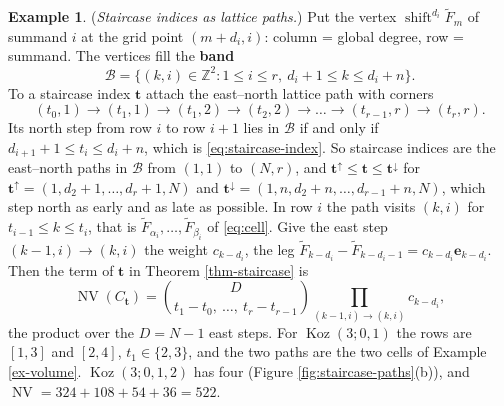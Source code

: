 \documentclass[11pt, a4paper, abstract=yes]{scrartcl}
\theoremstyle{definition}
\newtheorem{mexample}[definition]{Example}
\theoremstyle{remark}
\theoremstyle{plain}
\newcommand{\vek}[1]{\boldsymbol{#1}}
\theoremstyle{remark}
\theoremstyle{plain}
\newcommand{\Koz}{\operatorname{Koz}}
\newcommand{\shift}{\operatorname{shift}}
\newcommand{\NV}{\operatorname{NV}}
\begin{document}
\begin{mexample}
(\emph{Staircase indices as lattice paths.}) Put the vertex \(\shift^{d_i}\tilde F_m\) of summand \(i\)
at the grid point \((m+d_i,i)\): column = global degree, row = summand. The vertices fill the \textbf{band}
\begin{equation}\label{eq:band}
  \mathcal B=\lbrace(k,i)\in\mathbb Z^2:1\le i\le r,\ d_i+1\le k\le d_i+n\rbrace .
\end{equation}
To a staircase index \(\vek t\) attach the east--north lattice path with corners
\[
  (t_0,1)\to(t_1,1)\to(t_1,2)\to(t_2,2)\to\dots\to(t_{r-1},r)\to(t_r,r).
\]
Its north step from row \(i\) to row \(i+1\) lies in \(\mathcal B\) if and only if
\(d_{i+1}+1\le t_i\le d_i+n\), which is \eqref{eq:staircase-index}. So staircase indices are the
east--north paths in \(\mathcal B\) from \((1,1)\) to \((N,r)\), and
\(\vek t^{\uparrow}\le\vek t\le\vek t^{\downarrow}\) for
\(\vek t^{\uparrow}=(1,d_2+1,\dots,d_r+1,N)\) and \(\vek t^{\downarrow}=(1,n,d_2+n,\dots,d_{r-1}+n,N)\),
which step north as early and as late as possible. In row \(i\) the path visits \((k,i)\) for
\(t_{i-1}\le k\le t_i\), that is \(\tilde F_{\alpha_i},\dots,\tilde F_{\beta_i}\) of
\eqref{eq:cell}. Give the east step \((k-1,i)\to(k,i)\) the weight \(c_{k-d_i}\), the leg
\(\tilde F_{k-d_i}-\tilde F_{k-d_i-1}=c_{k-d_i}\vek e_{k-d_i}\). Then the term of \(\vek t\) in
Theorem \ref{thm-staircase} is
\[
  \NV(C_{\vek t})=\binom{D}{t_1-t_0,\ \dots,\ t_r-t_{r-1}}\prod_{(k-1,i)\to(k,i)}c_{k-d_i} ,
\]
the product over the \(D=N-1\) east steps. For \(\Koz(3;0,1)\) the rows are \([1,3]\) and
\([2,4]\), \(t_1\in\lbrace2,3\rbrace\), and the two paths are the two cells of
Example \ref{ex-volume}. \(\Koz(3;0,1,2)\) has four (Figure \ref{fig:staircase-paths}(b)), and
\(\NV=324+108+54+36=522\).
\label{ex-staircase-paths}
\end{mexample}
\end{document}
